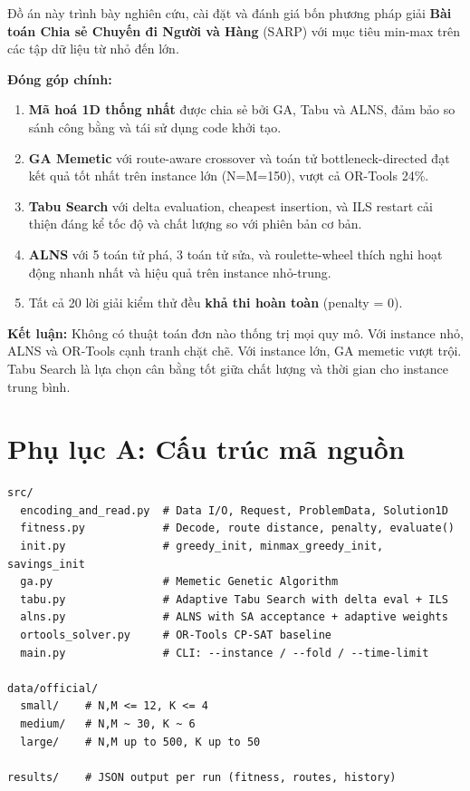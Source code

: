\documentclass[12pt, a4paper]{article}
\begin{document}
Đồ án này trình bày nghiên cứu, cài đặt và đánh giá bốn phương pháp giải \textbf{Bài toán Chia sẻ Chuyến đi Người và Hàng} (SARP) với mục tiêu min-max trên các tập dữ liệu từ nhỏ đến lớn.

\textbf{Đóng góp chính:}
\begin{enumerate}
  \item \textbf{Mã hoá 1D thống nhất} được chia sẻ bởi GA, Tabu và ALNS, đảm bảo so sánh công bằng và tái sử dụng code khởi tạo.
  \item \textbf{GA Memetic} với route-aware crossover và toán tử bottleneck-directed đạt kết quả tốt nhất trên instance lớn (N=M=150), vượt cả OR-Tools 24\%.
  \item \textbf{Tabu Search} với delta evaluation, cheapest insertion, và ILS restart cải thiện đáng kể tốc độ và chất lượng so với phiên bản cơ bản.
  \item \textbf{ALNS} với 5 toán tử phá, 3 toán tử sửa, và roulette-wheel thích nghi hoạt động nhanh nhất và hiệu quả trên instance nhỏ-trung.
  \item Tất cả 20 lời giải kiểm thử đều \textbf{khả thi hoàn toàn} (penalty = 0).
\end{enumerate}

\textbf{Kết luận:} Không có thuật toán đơn nào thống trị mọi quy mô. Với instance nhỏ, ALNS và OR-Tools cạnh tranh chặt chẽ. Với instance lớn, GA memetic vượt trội. Tabu Search là lựa chọn cân bằng tốt giữa chất lượng và thời gian cho instance trung bình.

\section*{Phụ lục A: Cấu trúc mã nguồn}

\begin{lstlisting}[language={},caption={Cấu trúc thư mục dự án}]
src/
  encoding_and_read.py  # Data I/O, Request, ProblemData, Solution1D
  fitness.py            # Decode, route distance, penalty, evaluate()
  init.py               # greedy_init, minmax_greedy_init, savings_init
  ga.py                 # Memetic Genetic Algorithm
  tabu.py               # Adaptive Tabu Search with delta eval + ILS
  alns.py               # ALNS with SA acceptance + adaptive weights
  ortools_solver.py     # OR-Tools CP-SAT baseline
  main.py               # CLI: --instance / --fold / --time-limit

data/official/
  small/    # N,M <= 12, K <= 4
  medium/   # N,M ~ 30, K ~ 6
  large/    # N,M up to 500, K up to 50

results/    # JSON output per run (fitness, routes, history)
\end{lstlisting}
\end{document}

